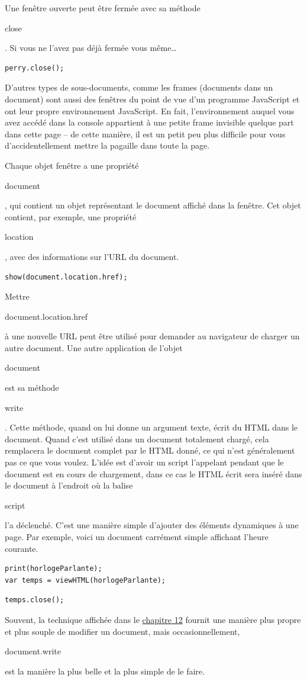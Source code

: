 \documentclass{FramateX}
\renewcommand{\texttt}[1]{\begin{sffamily}{#1}\end{sffamily}}
\begin{document}
Une fenêtre ouverte peut être fermée avec sa méthode \texttt{close}. Si
vous ne l'avez pas déjà fermée vous même\ldots{}

\begin{lstlisting}
perry.close();
\end{lstlisting}
D'autres types de sous-documents, comme les frames (documents dans un
document) sont aussi des fenêtres du point de vue d'un programme
JavaScript et ont leur propre environnement JavaScript. En fait,
l'environnement auquel vous avez accédé dans la console appartient à une
petite frame invisible quelque part dans cette page -- de cette manière,
il est un petit peu plus difficile pour vous d'accidentellement mettre
la pagaille dans toute la page.

\begin{center}\end{center}

Chaque objet fenêtre a une propriété \texttt{document}, qui contient un
objet représentant le document affiché dans la fenêtre. Cet objet
contient, par exemple, une propriété \texttt{location}, avec des
informations sur l'URL du document.

\begin{lstlisting}
show(document.location.href);
\end{lstlisting}
Mettre \texttt{document.location.href} à une nouvelle URL peut être
utilisé pour demander au navigateur de charger un autre document. Une
autre application de l'objet \texttt{document} est sa méthode
\texttt{write}. Cette méthode, quand on lui donne un argument texte,
écrit du HTML dans le document. Quand c'est utilisé dans un document
totalement chargé, cela remplacera le document complet par le HTML
donné, ce qui n'est généralement pas ce que vous voulez. L'idée est
d'avoir un script l'appelant pendant que le document est en cours de
chargement, dans ce cas le HTML écrit sera inséré dans le document à
l'endroit où la balise \texttt{script} l'a déclenché. C'est une manière
simple d'ajouter des éléments dynamiques à une page. Par exemple, voici
un document carrément simple affichant l'heure courante.

\begin{lstlisting}
print(horlogeParlante);
var temps = viewHTML(horlogeParlante);
\end{lstlisting}
\begin{lstlisting}
temps.close();
\end{lstlisting}
Souvent, la technique affichée dans le \href{chapter12.html}{chapitre
12} fournit une manière plus propre et plus souple de modifier un
document, mais occasionnellement, \texttt{document.write} est la manière
la plus belle et la plus simple de le faire.
\end{document}
